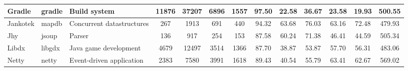 \begin{table*}[]
{\begin{tabular}{lll|ccc|cccc|ccc}
Gradle                      & gradle                                                        & Build system                                                             & 11876          & 37207           & 6896                                                             & 1557           & 97.50          & 22.58          & 36.67          & 23.58                                                             & 19.93                                                              & 500.55                                               \\ \hline
Jankotek                    & mapdb                                                         & Concurrent datastructures                                                & 267            & 1913            & 691                                                              & 440            & 94.32          & 63.68          & 76.03          & 63.16                                                             & 72.48                                                              & 479.93                                               \\ \hline
Jhy                         & jsoup                                                         & Parser                                                                   & 136            & 917             & 254                                                              & 153            & 87.58          & 60.24          & 71.38          & 46.41                                                             & 44.59                                                              & 505.34                                               \\ \hline
Libdx                       & libgdx                                                        & Java game development                                                    & 4679           & 12497           & 3514                                                             & 1366           & 87.70          & 38.87          & 53.87          & 57.70                                                             & 56.31                                                              & 483.06                                               \\ \hline
Netty                       & netty                                                         & Event-driven application                                                 & 2383           & 7580            & 3991                                                             & 1618           & 89.43          & 40.54          & 55.79          & 63.41                                                             & 62.67                                                              & 569.02                                               \\ \hline

\end{tabular}}
\end{table*}
